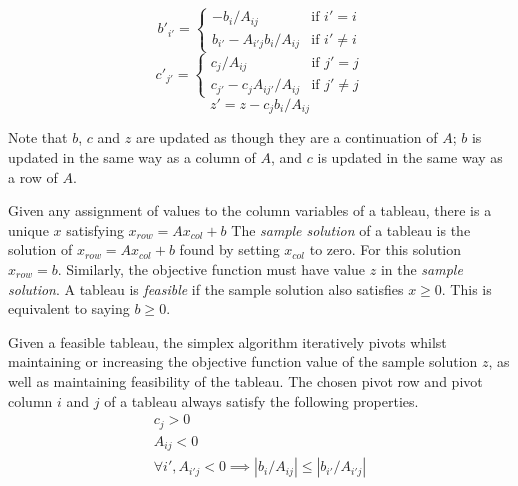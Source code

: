 \documentclass[11pt]{article} %
\begin{document}
\begin{equation}\label{eqn:pivot_const}
  b'_{i'} = \begin{cases}
    -b_i/A_{ij} & \text{if } i' = i \\
    b_{i'} - A_{i'j}b_i/A_{ij} & \text{if } i' \ne i
  \end{cases}
\end{equation}
\begin{equation}
  c'_{j'} = \begin{cases}
    c_j/A_{ij} & \text{if } j' = j \\
    c_{j'} - c_jA_{ij'}/A_{ij} & \text{if } j' \ne j
  \end{cases}
\end{equation}
\begin{equation}\label{eqn:pivot_obj}
  z' = z - c_jb_i/A_{ij}
\end{equation}

Note that $b$, $c$ and $z$ are updated as though they are a continuation of $A$; $b$ is updated in the same way as a column of $A$, and $c$ is updated in the same way as a row of $A$.

Given any assignment of values to the column variables of a tableau, there is a unique $x$ satisfying $x_{row}=Ax_{col}+b$ The \textit{sample solution} of a tableau is the solution of $x_{row} = Ax_{col}+b$ found by setting $x_{col}$ to zero. For this solution $x_{row}=b$. Similarly, the objective function must have value $z$ in the \textit{sample solution}. A tableau is \textit{feasible} if the sample solution also satisfies $x \ge 0$. This is equivalent to saying $b \ge 0$.

Given a feasible tableau, the simplex algorithm iteratively pivots whilst maintaining or increasing the objective function value of the sample solution $z$, as well as maintaining feasibility of the tableau. The chosen pivot row and pivot column $i$ and $j$ of a tableau always satisfy the following properties.
\begin{equation}\label{eqn:valid_pivot}
  \begin{aligned}
    c_j > 0 \\
    A_{ij} < 0 \\
    \forall i', A_{i'j} < 0 \implies \left|b_i/A_{ij}\right| \le \left|b_{i'} / A_{i'j}\right|
  \end{aligned}
\end{equation}
\end{document}
